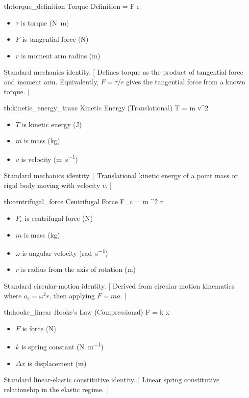 \documentclass[11pt]{article}
\numberwithin{equation}{section}
\newcounter{theory}
\begin{document}
\theory
{th:torque_definition}
{Torque Definition}
{\tau = F r}
{
\begin{itemize}
  \item $\tau$ is torque (\si{\newton\meter})
  \item $F$ is tangential force (\si{\newton})
  \item $r$ is moment arm radius (\si{\meter})
\end{itemize}
}
{Standard mechanics identity.}
[
Defines torque as the product of tangential force and moment arm.
Equivalently, $F = \tau / r$ gives the tangential force from a known torque.
]

\theory
{th:kinetic_energy_trans}
{Kinetic Energy (Translational)}
{T =  m v^2}
{
\begin{itemize}
  \item $T$ is kinetic energy (\si{\joule})
  \item $m$ is mass (\si{\kilogram})
  \item $v$ is velocity (\si{\meter\per\second})
\end{itemize}
}
{Standard mechanics identity.}
[
Translational kinetic energy of a point mass or rigid body moving with velocity $v$.
]

\theory
{th:centrifugal_force}
{Centrifugal Force}
{F_c = m \omega^2 r}
{
\begin{itemize}
  \item $F_c$ is centrifugal force (\si{\newton})
  \item $m$ is mass (\si{\kilogram})
  \item $\omega$ is angular velocity (\si{\radian\per\second})
  \item $r$ is radius from the axis of rotation (\si{\meter})
\end{itemize}
}
{Standard circular-motion identity.}
[
Derived from circular motion kinematics where $a_c = \omega^2 r$, then applying $F = ma$.
]


\theory
{th:hooke_linear}
{Hooke's Law (Compressional)}
{F = k \Delta x}
{
\begin{itemize}
  \item $F$ is force (\si{\newton})
  \item $k$ is spring constant (\si{\newton\per\meter})
  \item $\Delta x$ is displacement (\si{\meter})
\end{itemize}
}
{Standard linear-elastic constitutive identity.}
[
Linear spring constitutive relationship in the elastic regime.
]
\end{document}
